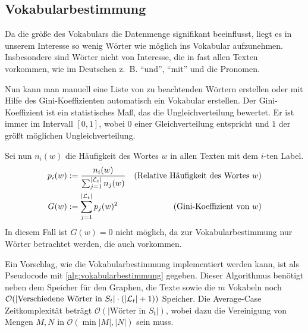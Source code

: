\subsection{Vokabularbestimmung}\label{sec:vokabularbestimmung}
Da die größe des Vokabulars die Datenmenge signifikant beeinflusst,
liegt es in unserem Interesse so wenig Wörter wie möglich ins
Vokabular aufzunehmen. Insbesondere sind Wörter nicht von Interesse,
die in fast allen Texten vorkommen, wie im Deutschen z.~B.
\enquote{und}, \enquote{mit} und die Pronomen.

Nun kann man manuell eine Liste von zu beachtenden Wörtern erstellen
oder mit Hilfe des Gini-Koeffizienten automatisch ein Vokabular erstellen.
Der Gini-Koeffizient ist ein statistisches Maß, das die Ungleichverteilung
bewertet. Er ist immer im Intervall $[0,1]$, wobei $0$ einer 
Gleichverteilung entspricht und $1$ der größt möglichen Ungleichverteilung.

Sei nun $n_i(w)$ die Häufigkeit des Wortes $w$ in allen Texten mit 
dem $i$-ten Label.
\begin{align}
    p_i(w) &:= \frac{n_i(w)}{\sum_{j=1}^{|\mathcal{L}_t|} n_j(w)} &\text{(Relative Häufigkeit des Wortes $w$)}\\
    G(w)   &:= \sum_{j=1}^{|\mathcal{L}_t|} p_j(w)^2              &\text{(Gini-Koeffizient von $w$)}
\end{align}
In diesem Fall ist $G(w)=0$ nicht möglich, da zur Vokabularbestimmung
nur Wörter betrachtet werden, die auch vorkommen.

Ein Vorschlag, wie die Vokabularbestimmung implementiert werden kann,
ist als Pseudocode mit \cref{alg:vokabularbestimmung}
gegeben. Dieser Algorithmus benötigt neben dem Speicher für den
Graphen, die Texte sowie die $m$ Vokabeln noch $\mathcal{O}(|\text{Verschiedene Wörter in } S_t| \cdot (|\mathcal{L}_t| + 1))$
Speicher. Die Average-Case Zeitkomplexität beträgt 
$\mathcal{O}(|\text{Wörter in } S_t|)$, wobei dazu die Vereinigung
von Mengen $M,N$ in $\mathcal{O}(\min{|M|, |N|})$ sein muss.

